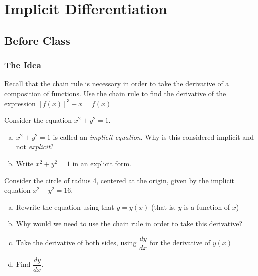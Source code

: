 \documentclass[notes]{subfiles}
\begin{document}
	\fancyhead[LO,RE]{\bfseries \currentname}
	\fancyfoot[C]{{}}
	\fancyfoot[RO,LE]{\large \thepage}	%
	
\section*{Implicit Differentiation}\label{cs38}
	\subsection*{Before Class}
	\subsubsection*{The Idea}
		\begin{ex}
			Recall that the chain rule is necessary in order to take the derivative of a composition of functions. Use the chain rule to find the derivative of the expression \([f(x)]^3 + x = f(x)\)
		\end{ex}
			
		\begin{ex}
			Consider the equation \(x^2 + y^2 = 1\).
			\begin{enumerate}[(a)]
				\item \(x^2 + y^2 = 1\) is called an \emph{implicit equation}.  Why is this considered implicit and not \emph{explicit}?
					
				\item Write \(x^2 + y^2 = 1\) in an explicit form.
					
			\end{enumerate}
		\end{ex}
		
		\begin{ex}
			Consider the circle of radius 4, centered at the origin, given by the implicit equation \(x^2 + y^2 = 16\).
			\begin{enumerate}[(a)]
				\item Rewrite the equation using that \(y = y(x)\) (that is, \(y\) is a function of \(x\))
					\vs{.5}
					\newpage
					
				\item Why would we need to use the chain rule in order to take this derivative?  
					\vs{.5}
					
				\item Take the derivative of both sides, using \(\dfrac{dy}{dx}\) for the derivative of \(y(x)\)
					\vs{1}
					
				\item Find \(\dfrac{dy}{dx}\).
					\vs{1}
			\end{enumerate}
		\end{ex}
		
\end{document}
